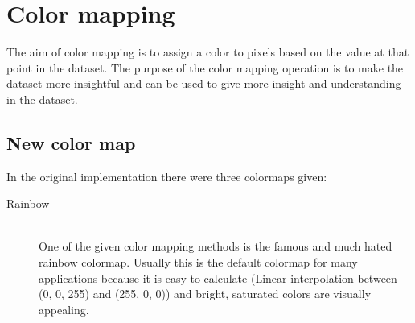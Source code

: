 \section{Color mapping}
	\label{sec:color_mapping}
	The aim of color mapping is to assign a color to pixels based on the value at that point in the dataset. 
	The purpose of the color mapping operation is to make the dataset more insightful and can be used to give more insight and understanding in the dataset.
	\subsection{New color map}
		In the original implementation there were three colormaps given:
		\begin{description}
			\item[Rainbow] ~\\
			One of the given color mapping methods is the famous and much hated\cite{RainbowMisleading}\cite{moreland2009diverging} rainbow colormap. 
			Usually this is the default colormap for many applications because it is easy to calculate (Linear interpolation between (0, 0, 255) and (255, 0, 0)) and bright, saturated colors are visually appealing.
			\begin{figure}[htb]
			  \centering

\end{figure}
\end{description}
